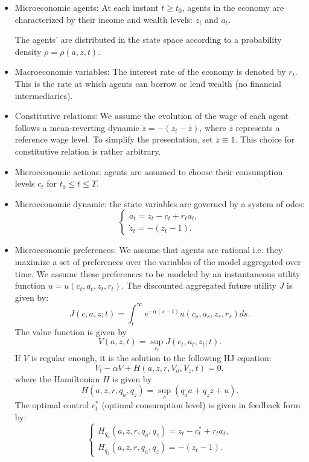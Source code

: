 \documentclass{article}
\begin{document}
\begin{itemize}
    \item Microeconomic agents: At each instant $t \geq t_0$, agents in the economy are characterized by
    their income and wealth levels: $z_t$ and $a_t$.
    
    The agents' are distributed in the state space according to a probability density $\rho = \rho(a,z,t)$.

    \item Macroeconomic variables: The interest rate of the economy is denoted by $r_t$. This is the 
    rate at which agents can borrow or lend wealth (no financial intermediaries).

    \item Constitutive relations: We assume the evolution of the wage of each agent follows a mean-reverting
    dynamic $\dot z = - (z_t - \bar z)$, where $\bar z$ represents a reference wage level. To simplify
    the presentation, set $\bar z \equiv 1$. This choice for constitutive relation is rather arbitrary.

    \item Microeconomic actions: agents are assumed to choose their consumption levels $c_t$ for 
    $t_0 \leq t \leq T$.

    \item Microeconomic dynamic: the state variables are governed by a system of odes:
    \begin{equation}
        \begin{cases}
            \dot a_t = z_t - c_t + r_t a_t, \\
            \dot z_t = - (z_t - 1).
        \end{cases}
    \end{equation}

    \item Microeconomic preferences: We assume that agents are rational i.e. they maximize a set of
    preferences over the variables of the model aggregated over time.
     We assume these preferences to be modeled by an
    instantaneous utility function $u = u(c_t,a_t, z_t, r_t)$. 
    The discounted aggregated future utility $J$ is given by:
    $$
    J(c,a,z; t) = \int_t^\infty e^{- \alpha (s - t)} u(c_s, a_s, z_s, r_s) ds.
    $$
    The value function is given by
    $$
    V(a,z,t) = \sup_{c_t} J(c_t, a_t, z_t; t).
    $$
    If $V$ is regular enough, it is the solution to the following HJ equation:
    $$
    V_t - \alpha V + H(a,z,r,V_a,V_z,t) = 0,
    $$
    where the Hamiltonian $H$ is given by
    $$
    H(a,z,r, q_a, q_z) = \sup_{c} (q_a \dot a + q_z \dot z + u).
    $$
    The optimal control $c^*_t$ (optimal consumption level) is given in feedback form by:
    \begin{equation}
        \begin{cases}
            H_{q_a}(a,z,r,q_a,q_z) = z_t - c_t^* + r_t a_t,\\
            H_{q_z} (a,z,r,q_a,q_z) = -(z_t - 1).
        \end{cases}
    \end{equation}
    

\end{itemize}
\end{document}
